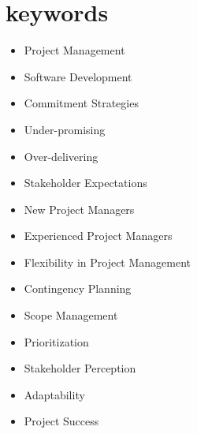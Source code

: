 \documentclass[12pt]{article}
\begin{document}
\section{keywords}
\begin{multicols}{2}
\begin{itemize}
 \item  Project Management
\item Software Development
\item Commitment Strategies
\item Under-promising
\item Over-delivering
\item Stakeholder Expectations
\item New Project Managers
\item Experienced Project Managers
\item Flexibility in Project Management
\item Contingency Planning
\item Scope Management
\item Prioritization
\item Stakeholder Perception
\item Adaptability
\item Project Success
\end{itemize}
\end{multicols}
\end{document}
